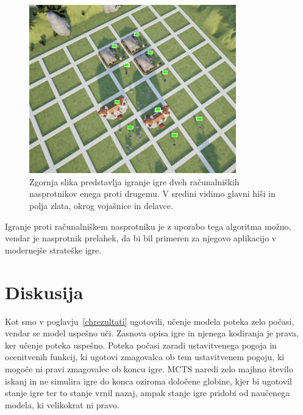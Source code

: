 \documentclass[a4paper, 12pt]{book}
\begin{document}
\begin{figure}[h]
	\begin{center}
		\includegraphics[width=0.8\textwidth]{photos/visualization_ue4.pdf}
	\end{center}
	\caption{Zgornja slika predstavlja igranje igre dveh računalniških nasprotnikov enega proti drugemu. V sredini vidimo glavni hiši in polja zlata, okrog vojašnice in delavce. }
	\label{visualization_ue4}
\end{figure}

Igranje proti računalniškem nasprotniku je z uporabo tega algoritma možno, vendar je nasprotnik prelahek, da bi bil primeren za njegovo aplikacijo v modernejše strateške igre.


\chapter{Diskusija}
\label{chdiskusija}

Kot smo v poglavju~\ref{chrezultati} ugotovili, učenje modela poteka zelo počasi, vendar se model uspešno uči.
Zasnova opisa igre in njenega kodiranja je prava, ker učenje poteka uspešno.
Poteka počasi zaradi ustavitvenega pogoja in ocenitvenih funkcij, ki ugotovi zmagovalca ob tem ustavitvenem pogoju, ki mogoče ni pravi zmagovalec ob koncu igre.
MCTS naredi zelo majhno število iskanj in ne simulira igre do konca oziroma določene globine, kjer bi ugotovil stanje igre ter to stanje vrnil nazaj, ampak stanje igre pridobi od naučenega modela, ki velikokrat ni pravo.
\end{document}
